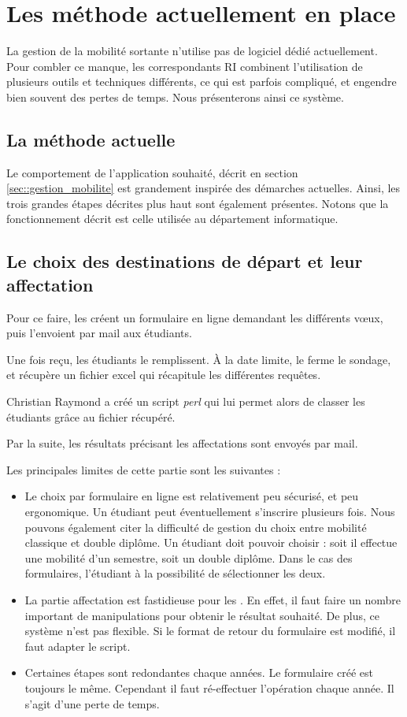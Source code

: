 
		\section{Les méthode actuellement en place}
	

La gestion de la mobilité sortante n'utilise pas de logiciel dédié actuellement. Pour combler ce manque, les correspondants RI combinent l'utilisation de plusieurs outils et techniques différents, ce qui est parfois compliqué, et engendre bien souvent des pertes de temps. Nous présenterons ainsi ce système.

\subsection{La méthode actuelle}

Le comportement de l'application souhaité, décrit en section \ref{sec::gestion_mobilite} est grandement inspirée des démarches actuelles. Ainsi, les trois grandes étapes décrites plus haut sont également présentes. Notons que la fonctionnement  décrit est celle utilisée au département informatique.  
 \subsection{Le choix des destinations de départ et leur affectation}
		 
		Pour ce faire, les \ris créent un formulaire en ligne demandant les différents vœux, puis l'envoient par mail aux étudiants. 
		
		Une fois reçu, les étudiants le remplissent. À la date limite, le \ri ferme le sondage, et récupère un fichier excel qui récapitule les différentes requêtes. 
		
		Christian Raymond a créé un script \textit{perl} qui lui permet alors de classer les étudiants grâce au fichier récupéré.
		
		Par la suite, les résultats  précisant les affectations sont envoyés par mail. 
		
		\medbreak
		
		Les principales limites de cette partie sont les suivantes : 
		\begin{itemize}
		\item Le choix par formulaire en ligne est relativement peu sécurisé, et peu ergonomique. Un étudiant peut  éventuellement s'inscrire plusieurs fois. Nous pouvons également citer la difficulté de gestion du choix entre mobilité classique et double diplôme. Un étudiant doit pouvoir choisir : soit il effectue une mobilité d'un semestre, soit un double diplôme. Dans le cas des formulaires, l'étudiant à la possibilité de sélectionner les deux. 
		\item La partie affectation est fastidieuse  pour les \ris. En effet, il faut faire un nombre important de manipulations pour obtenir le résultat  souhaité. De plus, ce système n'est pas flexible. Si le format de retour du formulaire est modifié, il faut adapter le script. 
		\item Certaines étapes sont redondantes chaque années. Le formulaire créé est toujours le même. Cependant il faut ré-effectuer l'opération chaque année. Il s'agit d'une perte de temps. 
		\end{itemize}

